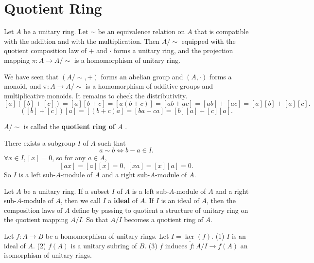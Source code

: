 \documentclass{book}
\numberwithin{equation}{section}
\begin{document}
\section{Quotient Ring}
\begin{propositionenv}
    Let $A$ be a unitary ring. Let $\sim$ be an equivalence relation on $A$ that is compatible with the addition and with the multiplication. Then $A/\sim$ equipped with the quotient composition law of $+$ and $\cdot$ forms a unitary ring, and the projection mapping $\pi:A\longrightarrow A/\sim$ is a homomorphism of unitary ring.
\end{propositionenv}
\begin{proofenv}
    We have seen that $(A/\sim,+)$ forms an abelian group and $(A,\cdot)$ forms a monoid, and $\pi:A\longrightarrow A/\sim$ is a homomorphism of additive groups and multiplicative monoids. It remains to check the distributivity.
    $$[a]([b]+[c])=[a][b+c]=[a(b+c)]=[ab+ac]=[ab]+[ac]=[a][b]+[a][c].$$
    $$([b]+[c])[a]=[(b+c)a]=[ba+ca]=[b][a]+[c][a].$$
\end{proofenv}
\begin{definitionenv}
    $A/\sim$ is called the \textbf{quotient ring of $A$ }.
\end{definitionenv}
\begin{remark}
    There exists a subgroup $I$ of $A$ such that 
    $$a\sim b\Leftrightarrow b-a\in I.$$
    $\forall x\in I,[x]=0$, so  for any $ a\in A$,
    $$[ax]=[a][x]=0,\ [xa]=[x][a]=0.$$
    So $I$ is a left sub-$A$-module of $A$ and a right sub-$A$-module of $A$.
\end{remark}
\begin{definitionenv}
    Let $A$ be a unitary ring. If a subset $I$ of $A$ is a left sub-$A$-module of $A$ and a right sub-$A$-module of $A$, then we call $I$ a \textbf{ideal} of $A$. If $I$ is an ideal of $A$, then the composition laws of $A$ define by passing to quotient a structure of unitary ring on the quotient mapping $A/I$. So that $A/I$ becomes a quotient ring of $A$.
\end{definitionenv}
\begin{theoremenv}
    Let $f:A\rightarrow B$ be a homomorphism of unitary rings. Let $I=\ker(f)$.
    \newline
    (1) $I$ is an ideal of $A$.
    \newline
    (2) $f(A)$ is a unitary subring of $B$.
    \newline
    (3) $f$ induces $\tilde{f}:A/I\longrightarrow f(A)$ an isomorphism of unitary rings.
\end{theoremenv}
\end{document}
